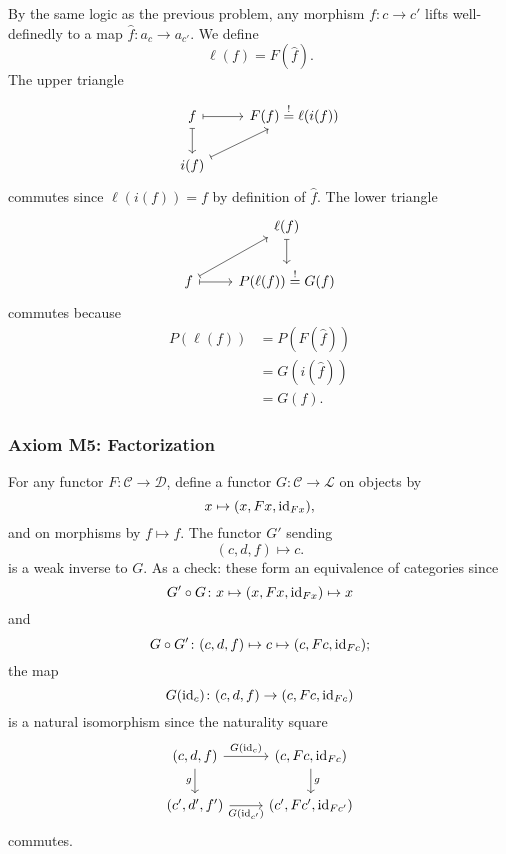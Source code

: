 \documentclass[main.tex]{subfiles}
\begin{document}
By the same logic as the previous problem, any morphism $f\colon c \to c'$ lifts well-definedly to a map $\hat{f}\colon a_{c} \to a_{c'}$. We define
\begin{equation*}
  \ell(f) = F(\hat{f}).
\end{equation*}
The upper triangle
\begin{equation*}
  \begin{tikzcd}
    f
    \arrow[r, mapsto]
    \arrow[d, mapsto]
    & F(f) \overset{!}{=} \ell(i(f))
    \\
    i(f)
    \arrow[ur, mapsto]
  \end{tikzcd}
\end{equation*}
commutes since $\ell(i(f)) = f$ by definition of $\hat{f}$. The lower triangle
\begin{equation*}
  \begin{tikzcd}
    & \ell(f)
    \arrow[d, mapsto]
    \\
    f
    \arrow[ur, mapsto]
    \arrow[r, mapsto]
    & P(\ell(f)) \overset{!}{=} G(f)
  \end{tikzcd}
\end{equation*}
commutes because
\begin{align*}
  P(\ell(f)) &= P(F(\hat{f})) \\
  &= G(i(\hat{f})) \\
  &= G(f).
\end{align*}

\subsubsection{Axiom M5: Factorization}
For any functor $F\colon \mathcal{C} \to \mathcal{D}$, define a functor $G\colon \mathcal{C} \to \mathcal{L}$ on objects by
\begin{equation*}
  x \mapsto (x, Fx, \mathrm{id}_{Fx}),
\end{equation*}
and on morphisms by $f \mapsto f$. The functor $G'$ sending
\begin{equation*}
  (c, d, f) \mapsto c.
\end{equation*}
is a weak inverse to $G$. As a check: these form an equivalence of categories since
\begin{equation*}
  G' \circ G\colon x \mapsto (x, Fx, \mathrm{id}_{Fx}) \mapsto x
\end{equation*}
and
\begin{equation*}
  G \circ G'\colon (c, d, f) \mapsto c \mapsto (c, Fc, \mathrm{id}_{Fc});
\end{equation*}
the map
\begin{equation*}
  G(\mathrm{id}_{c})\colon (c, d, f) \to (c, Fc, \mathrm{id}_{Fc})
\end{equation*}
is a natural isomorphism since the naturality square
\begin{equation*}
  \begin{tikzcd}
    (c, d, f)
    \arrow[r, "G(\id_{c})"]
    \arrow[d, swap, "g"]
    & (c, Fc, \id_{Fc})
    \arrow[d, "g"]
    \\
    (c', d', f')
    \arrow[r, swap, "G(\id_{c'})"]
    & (c', Fc', \id_{Fc'})
  \end{tikzcd}
\end{equation*}
commutes.
\end{document}
